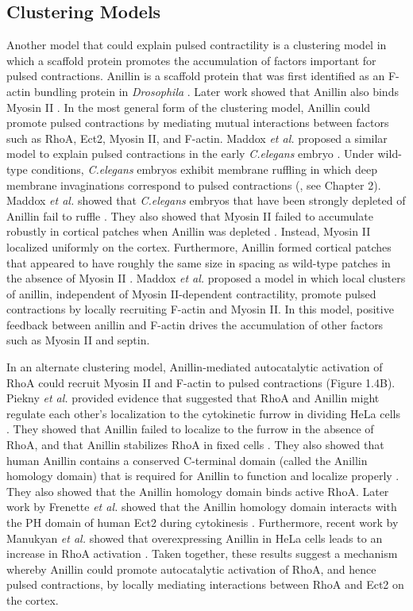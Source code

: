 \documentclass{ucetd}
\begin{document}
\subsection{Clustering Models}
Another model that could explain pulsed contractility is a clustering model in which a scaffold protein promotes the accumulation of factors important for pulsed contractions.  Anillin is a scaffold protein that was first identified as an F-actin bundling protein in \textit{Drosophila} \cite{Miller:1989vn}.  Later work showed that Anillin also binds Myosin II \cite{Piekny:2010es,Zhang:2010fb}.  In the most general form of the clustering model, Anillin could promote pulsed contractions by mediating mutual interactions between factors such as RhoA, Ect2, Myosin II, and F-actin.   Maddox \textit{et al.} proposed a similar model to explain pulsed contractions in the early \textit{C.elegans} embryo \cite{Maddox:2005gd}.  Under wild-type conditions, \textit{C.elegans} embryos exhibit membrane ruffling in which deep membrane invaginations correspond to pulsed contractions (\cite{Maddox:2005gd}, see Chapter 2).  Maddox \textit{et al.} showed that \textit{C.elegans} embryos that have been strongly depleted of Anillin fail to ruffle \cite{Maddox:2005gd}.  They also showed that Myosin II failed to accumulate robustly in cortical patches when Anillin was depleted \cite{Maddox:2005gd}.  Instead, Myosin II localized uniformly on the cortex.  Furthermore, Anillin formed cortical patches that appeared to have roughly the same size in spacing as wild-type patches in the absence of Myosin II \cite{Maddox:2005gd}.  Maddox \textit{et al.} proposed a model in which local clusters of anillin, independent of Myosin II-dependent contractility, promote pulsed contractions by locally recruiting F-actin and Myosin II.  In this model, positive feedback between anillin and F-actin drives the accumulation of other factors such as Myosin II and septin.


In an alternate clustering model, Anillin-mediated autocatalytic activation of RhoA could recruit Myosin II and F-actin to pulsed contractions (Figure 1.4B).  Piekny \textit{et al.} provided evidence that suggested that RhoA and Anillin might regulate each other's localization to the cytokinetic furrow in dividing HeLa cells \cite{Piekny:2008jf}.  They showed that Anillin failed to localize to the furrow in the absence of RhoA, and that Anillin stabilizes RhoA in fixed cells \cite{Piekny:2008jf}.  They also showed that human Anillin contains a conserved C-terminal domain (called the Anillin homology domain) that is required for Anillin to function and localize properly \cite{Piekny:2008jf}.  They also showed that the Anillin homology domain binds active RhoA.  Later work by Frenette \textit{et al.} showed that the Anillin homology domain interacts with the PH domain of human Ect2 during cytokinesis \cite{Frenette:2012do}.  Furthermore, recent work by Manukyan \textit{et al.} showed that overexpressing Anillin in HeLa cells leads to an increase in RhoA activation \cite{Manukyan:2015gg}.  Taken together, these results suggest a mechanism whereby Anillin could promote autocatalytic activation of RhoA, and hence pulsed contractions, by locally mediating interactions between RhoA and Ect2 on the cortex.  
\end{document}
